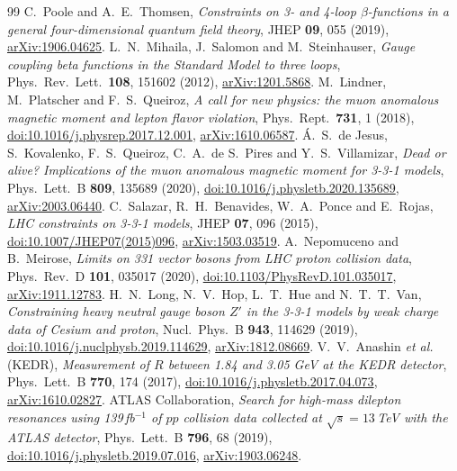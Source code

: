 \documentclass[11pt,a4paper]{article}
\begin{document}
\begin{thebibliography}{99}
 C.~Poole and A.~E.~Thomsen, \emph{Constraints on 3- and 4-loop $\beta$-functions in a general four-dimensional quantum field theory}, JHEP \textbf{09}, 055 (2019), \href{https://arxiv.org/abs/1906.04625}{arXiv:1906.04625}.
 L.~N.~Mihaila, J.~Salomon and M.~Steinhauser, \emph{Gauge coupling beta functions in the Standard Model to three loops}, Phys.\ Rev.\ Lett.\ \textbf{108}, 151602 (2012), \href{https://arxiv.org/abs/1201.5868}{arXiv:1201.5868}.
 M.~Lindner, M.~Platscher and F.~S.~Queiroz, \emph{A call for new physics: the muon anomalous magnetic moment and lepton flavor violation}, Phys.\ Rept.\ \textbf{731}, 1 (2018), \href{https://doi.org/10.1016/j.physrep.2017.12.001}{doi:10.1016/j.physrep.2017.12.001}, \href{https://arxiv.org/abs/1610.06587}{arXiv:1610.06587}.
 \'A.~S.~de Jesus, S.~Kovalenko, F.~S.~Queiroz, C.~A.~de S.~Pires and Y.~S.~Villamizar, \emph{Dead or alive? Implications of the muon anomalous magnetic moment for 3-3-1 models}, Phys.\ Lett.\ B \textbf{809}, 135689 (2020), \href{https://doi.org/10.1016/j.physletb.2020.135689}{doi:10.1016/j.physletb.2020.135689}, \href{https://arxiv.org/abs/2003.06440}{arXiv:2003.06440}.
 C.~Salazar, R.~H.~Benavides, W.~A.~Ponce and E.~Rojas, \emph{LHC constraints on 3-3-1 models}, JHEP \textbf{07}, 096 (2015), \href{https://doi.org/10.1007/JHEP07(2015)096}{doi:10.1007/JHEP07(2015)096}, \href{https://arxiv.org/abs/1503.03519}{arXiv:1503.03519}.
 A.~Nepomuceno and B.~Meirose, \emph{Limits on 331 vector bosons from LHC proton collision data}, Phys.\ Rev.\ D \textbf{101}, 035017 (2020), \href{https://doi.org/10.1103/PhysRevD.101.035017}{doi:10.1103/PhysRevD.101.035017}, \href{https://arxiv.org/abs/1911.12783}{arXiv:1911.12783}.
 H.~N.~Long, N.~V.~Hop, L.~T.~Hue and N.~T.~T.~Van, \emph{Constraining heavy neutral gauge boson $Z'$ in the 3-3-1 models by weak charge data of Cesium and proton}, Nucl.\ Phys.\ B \textbf{943}, 114629 (2019), \href{https://doi.org/10.1016/j.nuclphysb.2019.114629}{doi:10.1016/j.nuclphysb.2019.114629}, \href{https://arxiv.org/abs/1812.08669}{arXiv:1812.08669}.
 V.~V.~Anashin \emph{et al.} (KEDR), \emph{Measurement of $R$ between 1.84 and 3.05 GeV at the KEDR detector}, Phys.\ Lett.\ B \textbf{770}, 174 (2017), \href{https://doi.org/10.1016/j.physletb.2017.04.073}{doi:10.1016/j.physletb.2017.04.073}, \href{https://arxiv.org/abs/1610.02827}{arXiv:1610.02827}.
 ATLAS Collaboration, \emph{Search for high-mass dilepton resonances using 139\,fb$^{-1}$ of $pp$ collision data collected at $\sqrt{s}=13$\,TeV with the ATLAS detector}, Phys.\ Lett.\ B \textbf{796}, 68 (2019), \href{https://doi.org/10.1016/j.physletb.2019.07.016}{doi:10.1016/j.physletb.2019.07.016}, \href{https://arxiv.org/abs/1903.06248}{arXiv:1903.06248}.

\end{thebibliography}
\end{document}
